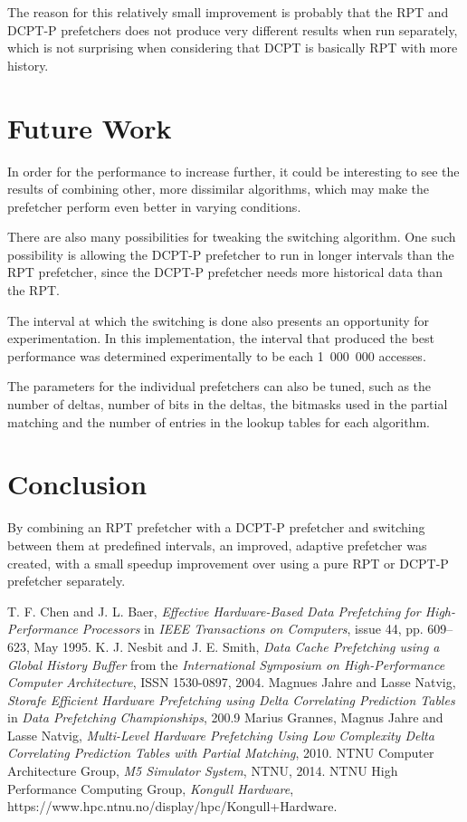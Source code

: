 \documentclass[journal,a4paper]{IEEEtran}
\begin{document}
The reason for this relatively small improvement is probably that the RPT and DCPT-P
prefetchers does not produce very different results when run separately, which is not
surprising when considering that DCPT is basically RPT with more history.

\section{Future Work}
In order for the performance to increase further, it could be interesting to see the
results of combining other, more dissimilar algorithms, which may make the prefetcher
perform even better in varying conditions.

There are also many possibilities for tweaking the switching algorithm. One such
possibility is allowing the DCPT-P prefetcher to run in longer intervals than the
RPT prefetcher, since the DCPT-P prefetcher needs more historical data than the RPT.

The interval at which the switching is done also presents an opportunity for
experimentation. In this implementation, the interval that produced the best
performance was determined experimentally to be each 1~000~000 accesses.

The parameters for the individual prefetchers can also be tuned, such as the number
of deltas, number of bits in the deltas, the bitmasks used in the partial matching
and the number of entries in the lookup tables for each algorithm.

\section{Conclusion}
By combining an RPT prefetcher with a DCPT-P prefetcher and switching between them at
predefined intervals, an improved, adaptive prefetcher was created, with a small speedup
improvement over using a pure RPT or DCPT-P prefetcher separately.

\begin{thebibliography}{1}
	 T. F. Chen and J. L. Baer, \emph{Effective Hardware-Based Data Prefetching for High-Performance Processors} in \emph{IEEE Transactions on Computers}, issue 44, pp. 609--623, May 1995.
	 K. J. Nesbit and J. E. Smith, \emph{Data Cache Prefetching using a Global History Buffer} from the \emph{International Symposium on High-Performance Computer Architecture}, ISSN 1530-0897, 2004.
	 Magnues Jahre and Lasse Natvig, \emph{Storafe Efficient Hardware Prefetching using Delta Correlating Prediction Tables} in \emph{Data Prefetching Championships}, 200.9
	 Marius Grannes, Magnus Jahre and Lasse Natvig, \emph{Multi-Level Hardware Prefetching Using Low Complexity Delta Correlating Prediction Tables with Partial Matching}, 2010.
	 NTNU Computer Architecture Group, \emph{M5 Simulator System}, NTNU, 2014.
	 NTNU High Performance Computing Group, \emph{Kongull Hardware}, https://www.hpc.ntnu.no/display/hpc/Kongull+Hardware.
\end{thebibliography}
\end{document}
